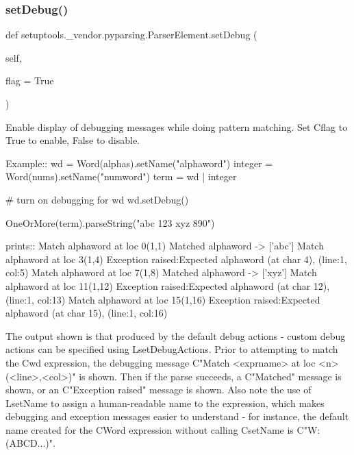 \subsubsection{\texorpdfstring{set\+Debug()}{setDebug()}}
{\footnotesize\ttfamily def setuptools.\+\_\+vendor.\+pyparsing.\+Parser\+Element.\+set\+Debug (\begin{DoxyParamCaption}\item[{}]{self,  }\item[{}]{flag = {\ttfamily True} }\end{DoxyParamCaption})}

\begin{DoxyVerb}Enable display of debugging messages while doing pattern matching.
Set C{flag} to True to enable, False to disable.

Example::
    wd = Word(alphas).setName("alphaword")
    integer = Word(nums).setName("numword")
    term = wd | integer
    
    # turn on debugging for wd
    wd.setDebug()

    OneOrMore(term).parseString("abc 123 xyz 890")

prints::
    Match alphaword at loc 0(1,1)
    Matched alphaword -> ['abc']
    Match alphaword at loc 3(1,4)
    Exception raised:Expected alphaword (at char 4), (line:1, col:5)
    Match alphaword at loc 7(1,8)
    Matched alphaword -> ['xyz']
    Match alphaword at loc 11(1,12)
    Exception raised:Expected alphaword (at char 12), (line:1, col:13)
    Match alphaword at loc 15(1,16)
    Exception raised:Expected alphaword (at char 15), (line:1, col:16)

The output shown is that produced by the default debug actions - custom debug actions can be
specified using L{setDebugActions}. Prior to attempting
to match the C{wd} expression, the debugging message C{"Match <exprname> at loc <n>(<line>,<col>)"}
is shown. Then if the parse succeeds, a C{"Matched"} message is shown, or an C{"Exception raised"}
message is shown. Also note the use of L{setName} to assign a human-readable name to the expression,
which makes debugging and exception messages easier to understand - for instance, the default
name created for the C{Word} expression without calling C{setName} is C{"W:(ABCD...)"}.
\end{DoxyVerb}
 \mbox{\label{classsetuptools_1_1__vendor_1_1pyparsing_1_1_parser_element_ad451f13e3d97e07edc726f65fecc37a8}} 
